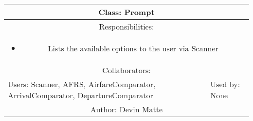 \begin{center}
    \begin{tabular}{ |p{7cm}|p{7cm}|  }
        \hline
        \multicolumn{2}{|c|}{Class: Prompt} \\
        \hline
        \multicolumn{2}{|c|}{Responsibilities:} \\ \multicolumn{2}{|c|}{\parbox{0.9\textwidth}{
        \begin{itemize}
            \item Lists the available options to the user via Scanner
        \end{itemize} }} \\
        \hline
        \multicolumn{2}{|c|}{Collaborators:} \\
        \hline
        Users: Scanner, AFRS, AirfareComparator, ArrivalComparator, DepartureComparator & Used by: None \\
        \hline
        \multicolumn{2}{|c|}{Author: Devin Matte} \\
        \hline
    \end{tabular}
\end{center}